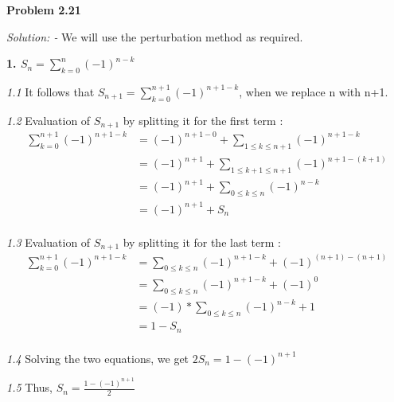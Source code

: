 \documentclass[12pt]{article}
\begin{document}
\noindent
{\bf Problem 2.21}

{\textit {Solution: - } We will use the perturbation method as required.}

{\bf 1. $S_n = \sum\limits_{k=0} ^{n} (-1)^{n-k}$}

{\textit {1.1} }It follows that $S_{n+1} = \sum\limits_{k=0} ^{n+1} (-1)^{n+1-k}$, when we replace n with n+1.

{\textit {1.2}} Evaluation of $S_{n+1}$ by splitting it for the first term :
\begin{equation}\label{eq2}
                                  \begin{split}
                                     \sum\limits_{k=0}^{n+1} (-1)^{n+1-k} & = (-1)^{n+1-0} + \sum\limits_{1\leq k\leq n+1} (-1)^{n+1-k}\\
                                       & =(-1)^{n+1} + \sum\limits_{1\leq k+1\leq n+1} (-1)^{n+1-(k+1)} \\
                                       & =(-1)^{n+1} + \sum\limits_{0\leq k\leq n} (-1)^{n-k}\\
                                       & =(-1)^{n+1} + S_n\\
                                  \end{split}
                                \end{equation}

{\textit {1.3}} Evaluation of $S_{n+1}$ by splitting it for the last term :
\begin{equation}\label{eq3}
                                  \begin{split}
                                     \sum\limits_{k=0}^{n+1} (-1)^{n+1-k} & = \sum\limits_{0\leq k\leq n} (-1)^{n+1-k} + (-1)^{(n+1) - (n+1)}\\
                                       & =\sum\limits_{0\leq k\leq n} (-1)^{n+1-k} + (-1)^{0} \\
                                       & =(-1) * \sum\limits_{0\leq k\leq n} (-1)^{n-k} + 1\\
                                       & =1 - S_n\\
                                  \end{split}
                                \end{equation}

{\textit {1.4}} Solving the two equations, we get $2S_n = 1 - (-1)^{n+1}$

{\textit {1.5}} Thus, {\bf $S_n = \frac{1 - (-1)^{n+1}}{2}$ }
\end{document}
